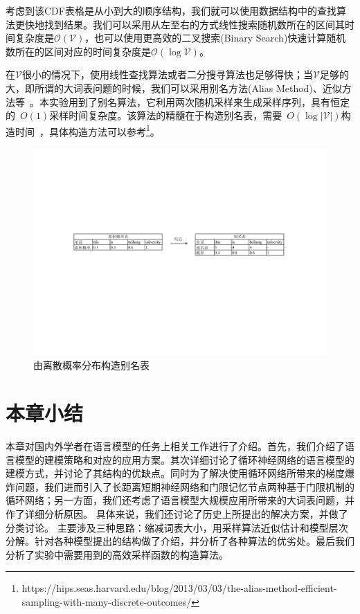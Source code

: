 考虑到该CDF表格是从小到大的顺序结构，我们就可以使用数据结构中的查找算法更快地找到结果。我们可以采用从左至右的方式线性搜索随机数所在的区间其时间复杂度是$\mathcal{O}(\mathcal{V})$，也可以使用更高效的二叉搜索(Binary Search)快速计算随机数所在的区间对应的时间复杂度是$\mathcal{O}(\log \mathcal{V})$。



在$\mathcal{V}$很小的情况下，使用线性查找算法或者二分搜寻算法也足够得快；当$\mathcal{V}$足够的大，即所谓的大词表问题的时候，我们可以采用别名方法(Alias Method)、近似方法等~。本实验用到了别名算法，它利用两次随机采样来生成采样序列，具有恒定的~$O(1)$采样时间复杂度。该算法的精髓在于构造别名表，需要~$O(\log |\mathcal{V}|)$构造时间~，具体构造方法可以参考\footnote{https://hips.seas.harvard.edu/blog/2013/03/03/the-alias-method-efficient-sampling-with-many-discrete-outcomes/}。

\begin{figure}[!ht]
  \centering
\includegraphics[width=1\linewidth]{./figures/alias.pdf}
\caption{由离散概率分布构造别名表}\label{fig:alias}
\end{figure}

\section{本章小结}
本章对国内外学者在语言模型的任务上相关工作进行了介绍。首先，我们介绍了语言模型的建模策略和对应的应用方案。其次详细讨论了循环神经网络的语言模型的建模方式，并讨论了其结构的优缺点。同时为了解决使用循环网络所带来的梯度爆炸问题，我们进而引入了长距离短期神经网络和门限记忆节点两种基于门限机制的循环网络；另一方面，我们还考虑了语言模型大规模应用所带来的大词表问题，并作了详细分析原因。
具体来说，我们还讨论了历史上所提出的解决方案，并做了分类讨论。
主要涉及三种思路：缩减词表大小，用采样算法近似估计和模型层次分解。针对各种模型提出的结构做了介绍，并分析了各种算法的优劣处。最后我们分析了实验中需要用到的高效采样函数的构造算法。